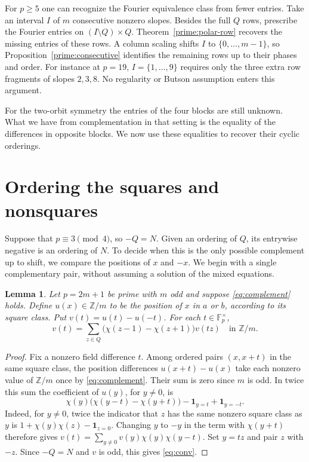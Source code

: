 \documentclass[11pt,a4paper]{article}
\newtheorem{lemma}[theorem]{Lemma}
\numberwithin{equation}{section}
\begin{document}
For $p\ge5$ one can recognize the Fourier equivalence class from fewer entries. Take an interval $I$ of $m$ consecutive nonzero slopes. Besides the full $Q$ rows, prescribe the Fourier entries on $(I\setminus Q)\times Q$. Theorem~\ref{prime:polar-row} recovers the missing entries of these rows. A column scaling shifts $I$ to $\{0,\ldots,m-1\}$, so Proposition~\ref{prime:consecutive} identifies the remaining rows up to their phases and order. For instance at $p=19$, $I=\{1,\ldots,9\}$ requires only the three extra row fragments of slopes $2,3,8$. No regularity or Butson assumption enters this argument.

For the two-orbit symmetry the entries of the four blocks are still unknown. What we have from complementation in that setting is the equality of the differences in opposite blocks. We now use these equalities to recover their cyclic orderings.

\section{Ordering the squares and nonsquares}\label{sec:ordering}

Suppose that $p\equiv3\pmod4$, so $-Q=N$. Given an ordering of $Q$, its entrywise negative is an ordering of $N$. To decide when this is the only possible complement up to shift, we compare the positions of $x$ and $-x$. We begin with a single complementary pair, without assuming a solution of the mixed equations.

\begin{lemma}\label{lem:position}
Let $p=2m+1$ be prime with $m$ odd and suppose \eqref{eq:complement} holds. Define $u(x)\in\mathbb Z/m$
to be the position of $x$ in $a$ or $b$, according to its square class.
Put $v(t)=u(t)-u(-t)$. For each $t\in\mathbb F_p^\times$,
\begin{equation}
v(t)=\sum_{z\in Q}\bigl(\chi(z-1)-\chi(z+1)\bigr)v(tz)
\quad\text{in }\mathbb Z/m .
\label{eq:conv}
\end{equation}
\end{lemma}
\begin{proof}
Fix a nonzero field difference $t$. Among ordered pairs $(x,x+t)$
in the same square class, the position differences $u(x+t)-u(x)$
take each nonzero value of $\mathbb Z/m$ once by \eqref{eq:complement}.
Their sum is zero since $m$ is odd. In twice this sum the coefficient of $u(y)$,
for $y\ne0$, is
\[
\chi(y)\bigl(\chi(y-t)-\chi(y+t)\bigr)
       -\mathbf1_{y=t}+\mathbf1_{y=-t}.
\]
Indeed, for $y\ne0$, twice the indicator that $z$ has the same nonzero
square class as $y$ is $1+\chi(y)\chi(z)-\mathbf1_{z=0}$.
Changing $y$ to $-y$ in the term with $\chi(y+t)$ therefore gives
$v(t)=\sum_{y\ne0}v(y)\chi(y)\chi(y-t)$.
Set $y=tz$ and pair $z$ with $-z$. Since $-Q=N$ and $v$ is odd,
this gives \eqref{eq:conv}.
\end{proof}
\end{document}
